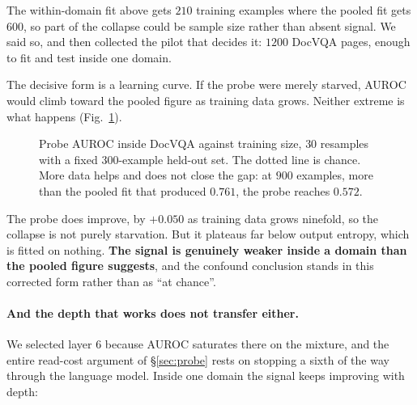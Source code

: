 \documentclass[10pt,twocolumn]{article}
\theoremstyle{plain}
\begin{document}
The within-domain fit above gets $210$ training examples where the pooled fit
gets $600$, so part of the collapse could be sample size rather than absent
signal. We said so, and then collected the pilot that decides it: $1200$ DocVQA
pages, enough to fit and test inside one domain.

The decisive form is a learning curve. If the probe were merely starved, AUROC
would climb toward the pooled figure as training data grows. Neither extreme is
what happens (Fig.~\ref{fig:curve}).

\begin{figure}[t]
\centering
{}
\caption{Probe AUROC inside DocVQA against training size, $30$ resamples with a
fixed $300$-example held-out set. The dotted line is chance. More data helps and
does not close the gap: at $900$ examples, more than the pooled fit that
produced $0.761$, the probe reaches $0.572$.}
\label{fig:curve}
\end{figure}

The probe does improve, by $+0.050$ as training data grows ninefold, so the
collapse is not purely starvation. But it plateaus far below output entropy,
which is fitted on nothing. \textbf{The signal is genuinely weaker inside a
domain than the pooled figure suggests}, and the confound conclusion stands in
this corrected form rather than as ``at chance''.

\paragraph{And the depth that works does not transfer either.} We selected layer
6 because AUROC saturates there on the mixture, and the entire read-cost
argument of \S\ref{sec:probe} rests on stopping a sixth of the way through the
language model. Inside one domain the signal keeps improving with depth:
\end{document}
